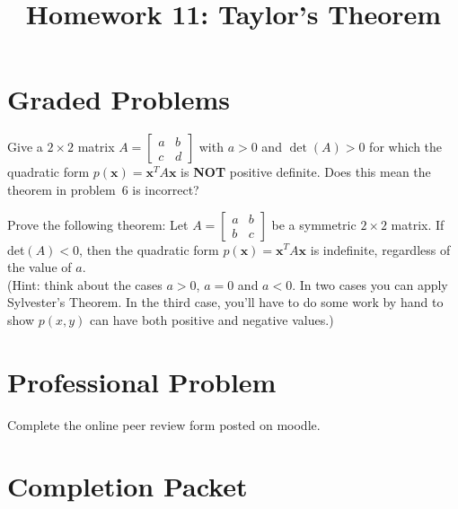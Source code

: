 \documentclass{ximera}
\title{Homework 11: Taylor's Theorem}
\begin{document}
\begin{abstract}
\end{abstract}
\maketitle

\section*{Graded Problems}

\begin{problem} Give a $2\times 2$ matrix  $A=\left[ \begin{array}{cc}
a & b  \\
c & d \end{array} \right]$ with $a > 0$ and $\det(A) >0$ for which the quadratic form $p(\mathbf{x})=\mathbf{x}^TA\mathbf{x}$ is \textbf{NOT} positive definite.  Does this mean the theorem in problem~6 is incorrect?

\end{problem}

\begin{problem} Prove the following theorem: Let $A=\left[ \begin{array}{cc}
a & b  \\
b & c \end{array} \right]$ be a symmetric $2\times 2$ matrix.   If det$(A)<0$, then the quadratic form $p(\mathbf{x})=\mathbf{x}^TA\mathbf{x}$ is indefinite, regardless of the value of $a$.\\ 

(Hint: think about the cases $a>0$, $a=0$ and $a<0$.  In two cases you can apply Sylvester's Theorem.  In the third case, you'll have to do some work by hand to show $p(x,y)$ can have both positive and negative values.)

\end{problem}

\section*{Professional Problem}

\begin{problem} Complete the online peer review form posted on moodle.
\end{problem}

\section*{Completion Packet}
\end{document}
